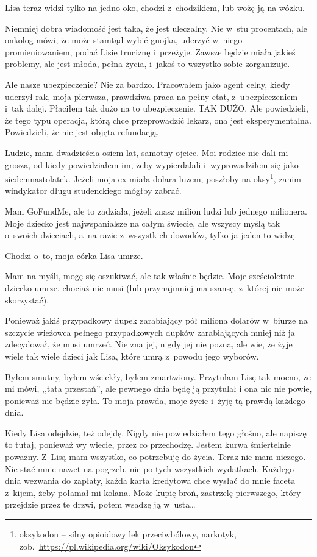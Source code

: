 \documentclass[oneside,polish,11pt,sfheadings]{mwbk}
\begin{document}
Lisa teraz widzi tylko na jedno oko, chodzi z~chodzikiem, lub wożę ją na
wózku.

Niemniej dobra wiadomość jest taka, że jest uleczalny. Nie w~stu
procentach, ale onkolog mówi, że może stamtąd wybić gnojka, uderzyć w~niego promieniowaniem, podać Lisie truciznę i~przeżyje. Zawsze będzie
miała jakieś problemy, ale jest młoda, pełna życia, i~jakoś to wszystko
sobie zorganizuje.

Ale nasze ubezpieczenie? Nie za bardzo. Pracowałem jako agent celny,
kiedy uderzył rak, moja pierwsza, prawdziwa praca na pełny etat, z~ubezpieczeniem i~tak dalej. Płaciłem tak dużo na to ubezpieczenie. TAK
DUŻO. Ale powiedzieli, że tego typu operacja, którą chce przeprowadzić
lekarz, ona jest eksperymentalna. Powiedzieli, że nie jest objęta
refundacją.

Ludzie, mam dwadzieścia osiem lat, samotny ojciec. Moi rodzice nie dali
mi grosza, od kiedy powiedziałem im, żeby wypierdalali i~wyprowadziłem
się jako siedemnastolatek. Jeżeli moja ex miała dolara luzem, poszłoby
na oksy\footnote{ oksykodon -- silny opioidowy lek przeciwbólowy, narkotyk,
zob.~\url{https://pl.wikipedia.org/wiki/Oksykodon}}, zanim
windykator długu studenckiego mógłby zabrać.

Mam GoFundMe, ale to zadziała, jeżeli znasz milion ludzi lub jednego
milionera. Moje dziecko jest najwspanialsze na całym świecie, ale
wszyscy myślą tak o~swoich dzieciach, a~na razie z~wszystkich dowodów,
tylko ja jeden to widzę.

Chodzi o~to, moja córka Lisa umrze.

Mam na myśli, mogę się oszukiwać, ale tak właśnie będzie. Moje
sześcioletnie dziecko umrze, chociaż nie musi (lub przynajmniej ma
szansę, z~której nie może skorzystać).

Ponieważ jakiś przypadkowy dupek zarabiający pół miliona dolarów w~biurze na szczycie wieżowca pełnego przypadkowych dupków zarabiających
mniej niż ja zdecydował, że musi umrzeć. Nie zna jej, nigdy jej nie
pozna, ale wie, że żyje wiele tak wiele dzieci jak Lisa, które umrą z~powodu jego wyborów.

Byłem smutny, byłem wściekły, byłem zmartwiony. Przytulam Lisę tak
mocno, że mi mówi, ,,tata przestań'', ale pewnego dnia będę ją przytulał
i ona nic nie powie, ponieważ nie będzie żyła. To moja prawda, moje
życie i~żyję tą prawdą każdego dnia.

Kiedy Lisa odejdzie, też odejdę. Nigdy nie powiedziałem tego głośno, ale
napiszę to tutaj, ponieważ wy wiecie, przez co przechodzę. Jestem kurwa
śmiertelnie poważny. Z~Lisą mam wszystko, co potrzebuję do życia. Teraz
nie mam niczego. Nie stać mnie nawet na pogrzeb, nie po tych wszystkich
wydatkach. Każdego dnia wezwania do zapłaty, każda karta kredytowa chce
wysłać do mnie faceta z~kijem, żeby połamał mi kolana. Może kupię broń,
zastrzelę pierwszego, który przejdzie przez te drzwi, potem wsadzę ją w~usta\ldots 
\end{document}
